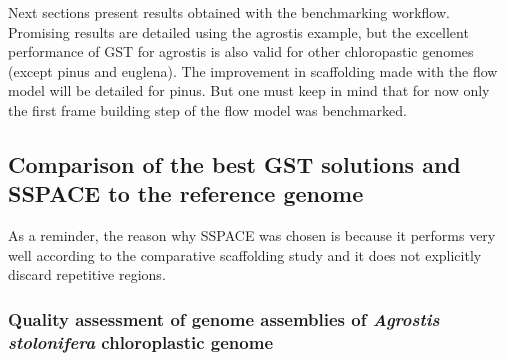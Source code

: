 \documentclass[12pt]{article}
\begin{document}
Next sections present results obtained with the benchmarking workflow. Promising results are detailed using the agrostis example, but the excellent performance of GST for agrostis is also valid for other chloropastic genomes (except pinus and euglena). The improvement in scaffolding made with the flow model will be detailed for pinus. But one must keep in mind that for now only the first frame building step of the flow model was benchmarked.

\newpage
\subsection{Comparison of the best GST solutions and SSPACE to the reference genome}
As a reminder, the reason why SSPACE was chosen is because it performs very well according to the comparative scaffolding study \cite{u} and it does not explicitly discard repetitive regions.
\subsubsection{Quality assessment of genome assemblies of \textit{Agrostis stolonifera} chloroplastic genome}
\end{document}
